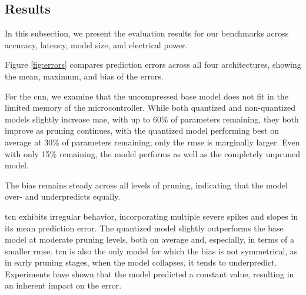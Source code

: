 \documentclass[final,3p,times]{elsarticle}
\begin{document}
\subsection{Results}







In this subsection, we present the evaluation results for our benchmarks across accuracy, latency, model size, and electrical power.

Figure \ref{fig:errors} compares prediction errors across all four architectures, showing the mean, maximum, and bias of the errors. 

For the \ac{cnn}, we examine that the uncompressed base model does not fit in the limited memory of the microcontroller. While both quantized and non-quantized models slightly increase \ac{mae}, with up to 60\% of parameters remaining, they both improve as pruning continues, with the quantized model performing best on average at 30\% of parameters remaining; only the \ac{rmse} is marginally larger. Even with only 15\% remaining, the model performs as well as the completely unpruned model. 

The bias remains steady across all levels of pruning, indicating that the model over- and underpredicts equally.

\ac{tcn} exhibits irregular behavior, incorporating multiple severe spikes and slopes in its mean prediction error. The quantized model slightly outperforms the base model at moderate pruning levels, both on average and, especially, in terms of a smaller \ac{rmse}. \ac{tcn} is also the only model for which the bias is not symmetrical, as in early pruning stages, when the model collapses, it tends to underpredict. Experiments have shown that the model predicted a constant value, resulting in an inherent impact on the error.
\end{document}

